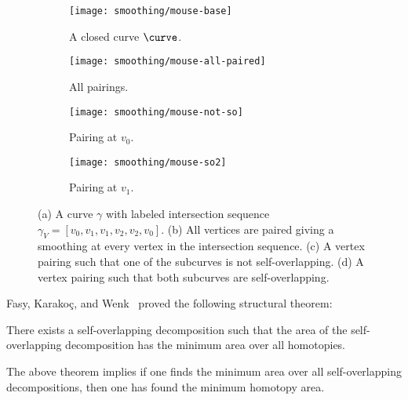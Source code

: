  \begin{figure}[htb]
  \centering
      \begin{subfigure}[b]{0.22\textwidth}
      \texttt{[image: smoothing/mouse-base]}
      \caption{A closed curve $\curve$.}
     \label{fig:intersections}
      \end{subfigure}
      \begin{subfigure}[b]{0.22\textwidth}
      \texttt{[image: smoothing/mouse-all-paired]}
      \caption{All pairings.}
      \label{fig:total-decomp}
      \end{subfigure}
     \begin{subfigure}[b]{0.22\textwidth}
      \texttt{[image: smoothing/mouse-not-so]}
      \caption{Pairing at $v_0$.}
      \label{fig:intersections-p0}
      \end{subfigure}
      \begin{subfigure}[b]{0.22\textwidth}
      \texttt{[image: smoothing/mouse-so2]}
      \caption{Pairing at $v_1$.}
      \label{fig:intersections-p1}
      \end{subfigure}

  \caption{
     (a) A curve $\gamma$ with labeled intersection sequence
      $\gamma_V=[v_0,v_1,v_1,v_2,v_2,v_0]$.
      (b) All vertices are paired giving a smoothing at every vertex in the intersection sequence.
      (c) A vertex pairing such that one of the subcurves is not self-overlapping.
      (d) A vertex pairing such that both subcurves are self-overlapping.}
  \label{fig:vertex-cut}
 \end{figure}



 Fasy, Karakoç, and Wenk~\cite{fkw2017} proved the following structural theorem:
 \begin{theorem}
 \label{thm:structual}
 There exists a self-overlapping decomposition such that the area of the self-overlapping
 decomposition has the minimum area over all homotopies.
 \end{theorem}
 The above theorem implies if one finds the minimum area over all self-overlapping decompositions,
 then one has found the minimum homotopy area.



